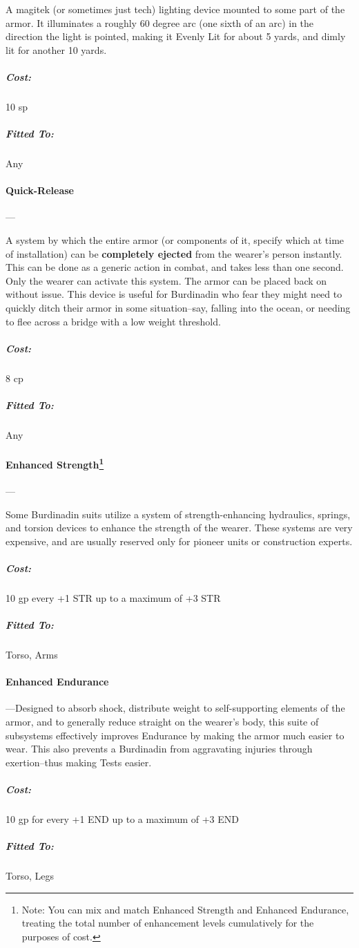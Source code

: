 \documentclass[oneside,11pt,english]{book}
\begin{document}
A magitek (or sometimes just tech) lighting device mounted to some part of the armor. It illuminates a 
roughly 60 degree arc (one sixth of an arc) in the direction the light is pointed, making it Evenly Lit for 
about 5 yards, and dimly lit for another 10 yards. 
\vspace{-15pt}\subparagraph{Cost:} 10 sp
\vspace{-15pt}\subparagraph{Fitted To:} Any

\paragraph{Quick-Release}---\quad[0]

A system by which the entire armor (or components of it, specify which at time of installation) can be 
\textbf{completely ejected} from the wearer’s person instantly. This can be done as a generic action in combat, 
and takes less than one second. Only the wearer can activate this system. The armor can be placed back 
on without issue. This device is useful for Burdinadin who fear they might need to quickly ditch their 
armor in some situation--say, falling into the ocean, or needing to flee across a bridge with a low weight threshold.
\vspace{-15pt}\subparagraph{Cost:} 8 cp
\vspace{-15pt}\subparagraph{Fitted To:} Any

\paragraph[Enhanced Strength]{Enhanced Strength\footnote{Note: You can mix and match Enhanced Strength and Enhanced Endurance, treating the total number of enhancement levels cumulatively for the purposes of cost.} }---

Some Burdinadin suits utilize a system of strength-enhancing hydraulics, springs, and torsion devices to 
enhance the strength of the wearer. These systems are very expensive, and are usually reserved only for 
pioneer units or construction experts. 
\vspace{-15pt}\subparagraph{Cost:} 10 gp every +1 STR up to a maximum of +3 STR 
\vspace{-15pt}\subparagraph{Fitted To:} Torso, Arms

\paragraph[Enhanced Endurance]{Enhanced Endurance\footnotemark[\value{footnote}] }--- 
Designed to absorb shock, distribute weight to self-supporting elements of the armor, and to generally 
reduce straight on the wearer’s body, this suite of subsystems effectively improves Endurance by making 
the armor much easier to wear. This also prevents a Burdinadin from aggravating injuries through 
exertion--thus making  Tests easier. 
\vspace{-15pt}\subparagraph{Cost:} 10 gp for every +1 END up to a maximum of +3 END 
\vspace{-15pt}\subparagraph{Fitted To:} Torso, Legs 
\end{document}
